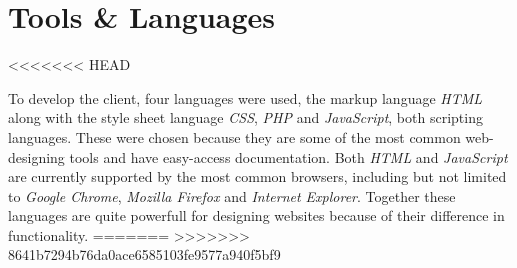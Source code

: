 \chapter{Tools \& Languages}
<<<<<<< HEAD

To develop the client, four languages were used, the markup language \textit{HTML} along with the style sheet language \textit{CSS}, \textit{PHP} and \textit{JavaScript}, both scripting languages. These were chosen because they are some of the most common web-designing tools and have easy-access documentation. Both \textit{HTML} and \textit{JavaScript} are currently supported by the most common browsers, including but not limited to \textit{Google Chrome}, \textit{Mozilla Firefox} and \textit{Internet Explorer}.
Together these languages are quite powerfull for designing websites because of their difference in functionality.
=======
\label{implementation_tools_languages}
>>>>>>> 8641b7294b76da0ace6585103fe9577a940f5bf9
